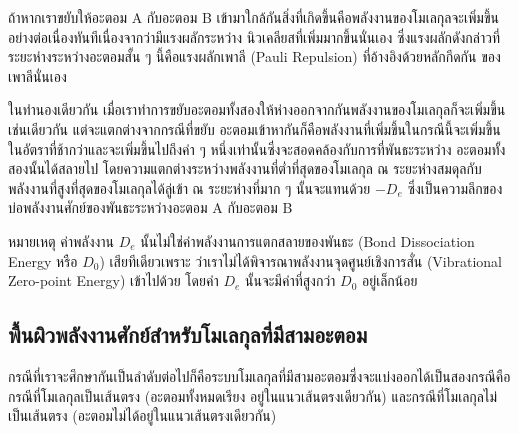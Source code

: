 ถ้าหากเราขยับให้อะตอม A กับอะตอม B เข้ามาใกล้กันสิ่งที่เกิดขึ้นคือพลังงานของโมเลกุลจะเพิ่มขึ้นอย่างต่อเนื่องทันทีเนื่องจากว่ามีแรงผลักระหว่าง%
นิวเคลียสที่เพิ่มมากขึ้นนั่นเอง ซึ่งแรงผลักดังกล่าวที่ระยะห่างระหว่างอะตอมสั้น ๆ นี้คือแรงผลักเพาลี (Pauli Repulsion) ที่อ้างอิงด้วยหลักกีดกัน%
ของเพาลีนั่นเอง

ในทำนองเดียวกัน เมื่อเราทำการขยับอะตอมทั้งสองให้ห่างออกจากกันพลังงานของโมเลกุลก็จะเพิ่มขึ้นเช่นเดียวกัน แต่จะแตกต่างจากกรณีที่ขยับ%
อะตอมเข้าหากันก็คือพลังงานที่เพิ่มขึ้นในกรณีนี้จะเพิ่มขึ้นในอัตราที่ช้ากว่าและจะเพิ่มขึ้นไปถึงค่า ๆ หนึ่งเท่านั้นซึ่งจะสอดคล้องกับการที่พันธะระหว่าง%
อะตอมทั้งสองนั้นได้สลายไป โดยความแตกต่างระหว่างพลังงานที่ต่ำที่สุดของโมเลกุล ณ ระยะห่างสมดุลกับพลังงานที่สูงที่สุดของโมเลกุลได้ลู่เข้า ณ 
ระยะห่างที่มาก ๆ นั้นจะแทนด้วย $-D_{e}$ ซึ่งเป็นความลึกของบ่อพลังงานศักย์ของพันธะระหว่างอะตอม A กับอะตอม B

หมายเหตุ ค่าพลังงาน $D_{e}$ นั้นไม่ใช่ค่าพลังงานการแตกสลายของพันธะ (Bond Dissociation Energy หรือ $D_{0}$) เสียทีเดียวเพราะ%
ว่าเราไม่ได้พิจารณาพลังงานจุดศูนย์เชิงการสั่น (Vibrational Zero-point Energy) เข้าไปด้วย โดยค่า $D_{e}$ นั้นจะมีค่าที่สูงกว่า $D_{0}$ 
อยู่เล็กน้อย

\subsection{พื้นผิวพลังงานศักย์สำหรับโมเลกุลที่มีสามอะตอม}
\label{ssec:pes_3_atoms}

กรณีที่เราจะศึกษากันเป็นลำดับต่อไปก็คือระบบโมเลกุลที่มีสามอะตอมซึ่งจะแบ่งออกได้เป็นสองกรณีคือกรณีที่โมเลกุลเป็นเส้นตรง (อะตอมทั้งหมดเรียง%
อยู่ในแนวเส้นตรงเดียวกัน) และกรณีที่โมเลกุลไม่เป็นเส้นตรง (อะตอมไม่ได้อยู่ในแนวเส้นตรงเดียวกัน) 

